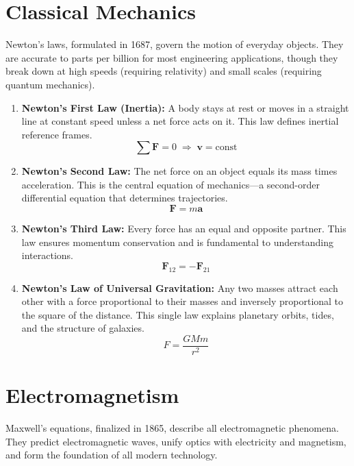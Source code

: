 \section*{Classical Mechanics}

Newton's laws, formulated in 1687, govern the motion of everyday objects. They are accurate to parts per billion for most engineering applications, though they break down at high speeds (requiring relativity) and small scales (requiring quantum mechanics).

\begin{enumerate}

\item \textbf{Newton's First Law (Inertia):} A body stays at rest or moves in a straight line at constant speed unless a net force acts on it. This law defines inertial reference frames.
\[
\sum \mathbf{F} = 0 \; \Rightarrow \; \mathbf{v} = \text{const}
\]

\item \textbf{Newton's Second Law:} The net force on an object equals its mass times acceleration. This is the central equation of mechanics---a second-order differential equation that determines trajectories.
\[
\mathbf{F} = m\mathbf{a}
\]

\item \textbf{Newton's Third Law:} Every force has an equal and opposite partner. This law ensures momentum conservation and is fundamental to understanding interactions.
\[
\mathbf{F}_{12} = -\mathbf{F}_{21}
\]

\item \textbf{Newton's Law of Universal Gravitation:} Any two masses attract each other with a force proportional to their masses and inversely proportional to the square of the distance. This single law explains planetary orbits, tides, and the structure of galaxies.
\[
F = \frac{GMm}{r^2}
\]

\end{enumerate}

\section*{Electromagnetism}

Maxwell's equations, finalized in 1865, describe all electromagnetic phenomena. They predict electromagnetic waves, unify optics with electricity and magnetism, and form the foundation of all modern technology.

